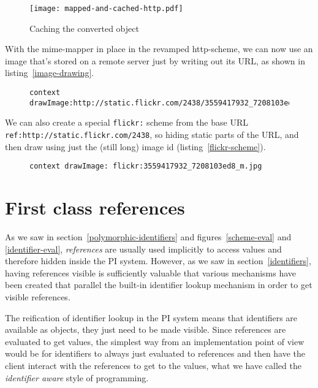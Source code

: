 \documentclass[preprint,authoryear]{llncs}
\begin{document}
\begin{figure}[htbp]
\begin{center}
\texttt{[image: mapped-and-cached-http.pdf]}
\caption{Caching the converted object}
\label{http-converted-cached}
\end{center}
\end{figure}


With the mime-mapper in place in the revamped http-scheme, we can now use 
an image that's stored on a remote server just by writing out its URL, as shown
in listing~\ref{image-drawing}.

\begin{figure}[htbp]
\begin{lstlisting}[style=L,label=image-drawing,caption=Drawing a remote image via {\tt http:}.]
context drawImage:http://static.flickr.com/2438/3559417932_7208103ed8_m.jpg
\end{lstlisting}
\end{figure}

We can also create a special {\tt flickr:} scheme from the base URL {\tt ref:http://static.flickr.com/2438},
so hiding static parts of the URL,
and then draw using just the (still long) image id (listing~\ref{flickr-scheme}).

\begin{figure}[htbp]
\begin{lstlisting}[style=L,label=flickr-scheme,caption=Drawing remote image via {\tt flickr:}]
context drawImage: flickr:3559417932_7208103ed8_m.jpg
\end{lstlisting}
\end{figure}


\section{First class references}
\label{references}


As we saw in section~\ref{polymorphic-identifiers} and figures~\ref{scheme-eval} and \ref{identifier-eval}, \emph{references}
are usually used implicitly to access values and therefore hidden inside the PI system.  However,
as we saw in section~\ref{identifiers}, having references visible is sufficiently valuable that various
mechanisms have been created that parallel the built-in identifier lookup mechanism in order to
get visible references.

The reification of identifier lookup in the PI system means that identifiers are available as objects, 
they just need to be made visible.   Since references are evaluated to get values, the 
simplest way from an implementation point of view would be for identifiers to always just
evaluated to references and then have the client interact with the references to get to
the values, what we have called the \emph{identifier aware} style of programming.
\end{document}

